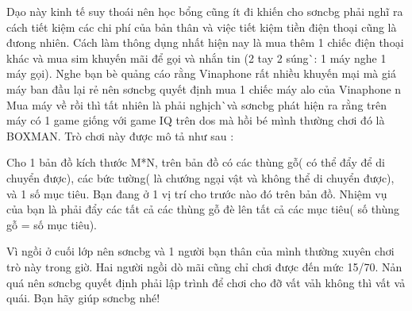 Dạo này kinh tế suy thoái nên học bổng cũng ít đi khiến cho sơncbg phải nghĩ ra cách tiết kiệm các chi phí của bản thân và việc tiết kiệm tiền điện thoại cũng là đưong nhiên. Cách làm thông dụng nhất hiện nay là mua thêm 1 chiếc điện thoại khác và mua sim khuyến mãi để gọi và nhắn tin (2 tay 2 súng^^ : 1 máy nghe 1 máy gọi). Nghe bạn bè quảng cáo rằng Vinaphone rất nhiều khuyến mại mà giá máy ban đầu lại rẻ nên sơncbg quyết định mua 1 chiếc máy alo của Vinaphone ^^. Mua máy về rồi thì tất nhiên là phải nghịch^^ và sơncbg phát hiện ra rằng trên máy có 1 game giống với game IQ trên dos mà hồi bé mình thường chơi đó là BOXMAN. Trò chơi này được mô tả như sau :

Cho 1 bản đồ kích thước M*N, trên bản đồ có các thùng gỗ( có thể đẩy để di chuyển được), các bức tường( là chướng ngại vật và không thể di chuyển được), và 1 số mục tiêu. Bạn đang ở 1 vị trí cho trước nào đó trên bản đồ. Nhiệm vụ của bạn là phải đẩy các tất cả các thùng gỗ đè lên tất cả các mục tiêu( số thùng gỗ = số mục tiêu).

Vì ngồi ở cuối lớp nên sơncbg và 1 người bạn thân của mình thường xuyên chơi trò này trong giờ. Hai người ngồi dò mãi cũng chỉ chơi được đến mức 15/70. Nản quá nên sơncbg quyết định phải lập trình để chơi cho đỡ vất vả^^( không thì vất vả quá^^). Bạn hãy giúp sơncbg nhé!